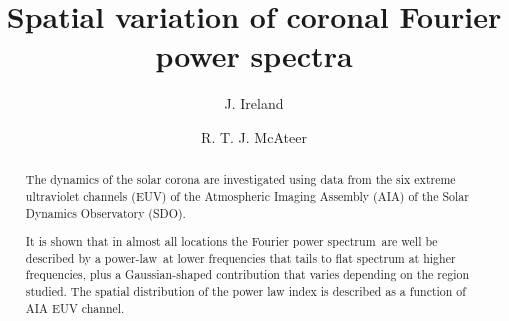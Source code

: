 \documentclass[onecolumn]{emulateapj}
\newcommand{\PS}{power spectrum}
\newcommand{\PL}{power-law}
\newcommand{\Fps}{Fourier \PS}
\begin{document}

\title{Spatial variation of coronal Fourier power spectra}


\author{J. Ireland}

\author{R. T. J. McAteer}



\begin{abstract}
The dynamics of the solar corona are investigated using data from the
six extreme ultraviolet channels (EUV) of the  Atmospheric Imaging
Assembly (AIA) of the Solar Dynamics Observatory (SDO).

It is shown that in almost all locations the \Fps\ are well be described by
a \PL\ at lower frequencies that tails to flat spectrum at higher
frequencies, plus a Gaussian-shaped contribution that varies depending
on the region studied.  The spatial distribution of the power law
index is described as a function of AIA EUV channel.


\end{abstract}


\end{document}
